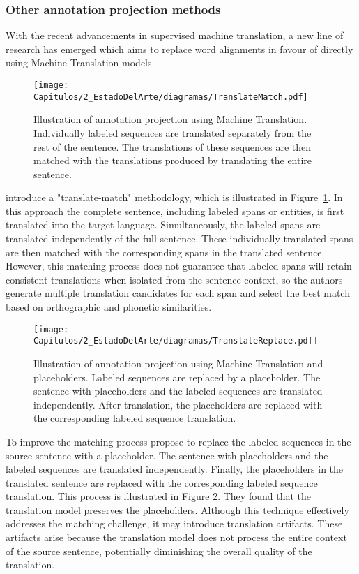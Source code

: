 \subsubsection{Other annotation projection methods}

With the recent advancements in supervised machine translation, a new line of research has emerged which aims to replace word alignments in favour of directly using Machine Translation models.  

\begin{figure}[htb]
    \centering
    \texttt{[image: Capitulos/2\_EstadoDelArte/diagramas/TranslateMatch.pdf]}
    \caption{Illustration of annotation projection using Machine Translation. Individually labeled sequences are translated separately from the rest of the sentence. The translations of these sequences are then matched with the translations produced by translating the entire sentence.}
    \label{fig:chap3_translate_match}
\end{figure}

\citet{DBLP:conf/emnlp/JainPL19} introduce a "translate-match" methodology, which is illustrated in Figure~\ref{fig:chap3_translate_match}. In this approach the complete sentence, including labeled spans or entities, is first translated into the target language. Simultaneously, the labeled spans are translated independently of the full sentence. These individually translated spans are then matched with the corresponding spans in the translated sentence. However, this matching process does not guarantee that labeled spans will retain consistent translations when isolated from the sentence context, so the authors generate multiple translation candidates for each span and select the best match based on orthographic and phonetic similarities.

\begin{figure}[hbp]
    \centering
    \texttt{[image: Capitulos/2\_EstadoDelArte/diagramas/TranslateReplace.pdf]}
    \caption{Illustration of annotation projection using Machine Translation and placeholders. Labeled sequences are replaced by a placeholder. The sentence with placeholders and the labeled sequences are translated independently. After translation, the placeholders are replaced with the corresponding labeled sequence translation.}
    \label{fig:chap3_translate_replace}
\end{figure}

To improve the matching process \cite{zhou-etal-2022-conner} propose to replace the labeled sequences in the source sentence with a placeholder. The sentence with placeholders and the labeled sequences are translated independently. Finally, the placeholders in the translated sentence are replaced with the corresponding labeled sequence translation. This process is illustrated in Figure \ref{fig:chap3_translate_replace}. They found that the translation model preserves the placeholders. Although this technique effectively addresses the matching challenge, it may introduce translation artifacts. These artifacts arise because the translation model does not process the entire context of the source sentence, potentially diminishing the overall quality of the translation.


